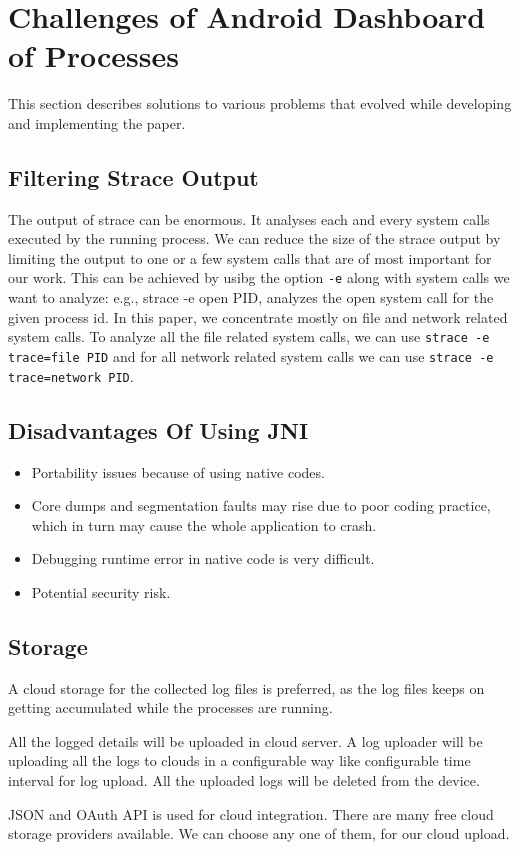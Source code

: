\section{Challenges of Android Dashboard of Processes}\label{Challenges}

This section describes solutions to various problems that evolved
while developing and implementing the paper.

\subsection{Filtering Strace Output}

The output of strace can be enormous.  It analyses each and every
system calls executed by the running process.  We can reduce the size
of the strace output by limiting the output to one or a few system
calls that are of most important for our work.  This can be achieved
by usibg the option {\tt -e} along with system calls we want to
analyze: e.g., strace -e open PID, analyzes the open system call for
the given process id.  In this paper, we concentrate mostly on file
and network related system calls.  To analyze all the file related
system calls, we can use {\tt strace -e trace=file PID} and for all
network related system calls we can use {\tt strace -e trace=network
  PID}.
	
\subsection{Disadvantages Of Using JNI}
\begin{itemize}
	\item Portability issues because of using native codes.
	\item Core dumps and segmentation faults may rise due to poor coding practice, which in turn may cause the whole application to crash.  
	\item Debugging runtime error in native code is very difficult.  
	\item Potential security risk.
\end{itemize}

\subsection{Storage}

A cloud storage for the collected log files is preferred, as the log
files keeps on getting accumulated while the processes are running.

All the logged details will be uploaded in cloud server.  A log
uploader will be uploading all the logs to clouds in a configurable
way like configurable time interval for log upload.  All the uploaded
logs will be deleted from the device.

JSON and OAuth API is used for cloud integration.  There are many free
cloud storage providers available.  We can choose any one of them, for
our cloud upload.
